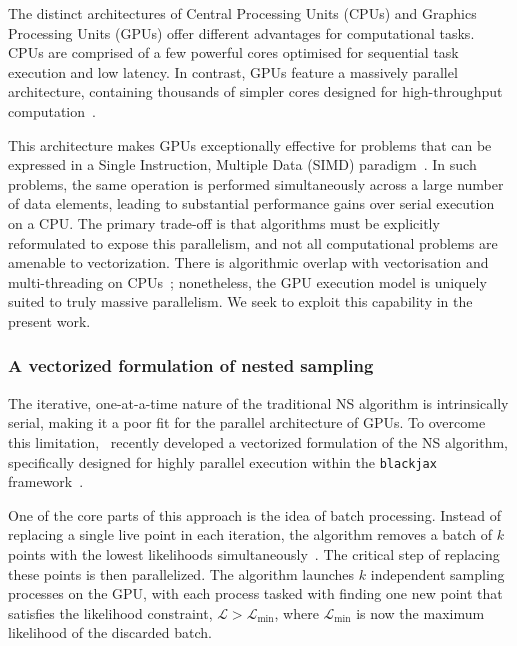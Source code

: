 \documentclass[fleqn,usenatbib]{mnras}
\begin{document}
The distinct architectures of Central Processing Units (CPUs) and
Graphics Processing Units (GPUs) offer different advantages for
computational tasks. CPUs are comprised of a few powerful cores
optimised for sequential task execution and low latency. In contrast,
GPUs feature a massively parallel architecture, containing thousands of
simpler cores designed for high-throughput computation~\citep{GPU_computing}.

This architecture makes GPUs exceptionally effective for problems that can
be expressed in a Single Instruction, Multiple Data (SIMD) paradigm~\citep{CUDAGuide}.
In such problems, the same operation is performed simultaneously across
a large number of data elements, leading to substantial performance
gains over serial execution on a CPU. The primary trade-off is that
algorithms must be explicitly reformulated to expose this parallelism,
and not all computational problems are amenable to vectorization.
There is algorithmic overlap with vectorisation and multi-threading on CPUs~\citep{Handley:2015vkr, Smith:2019ucc}; 
nonetheless, the GPU execution model is uniquely suited to truly massive parallelism. We seek to exploit this capability in the present work.


\subsubsection{A vectorized formulation of nested sampling}
\label{sec:background_vectorized_ns}

The iterative, one-at-a-time nature of the traditional NS algorithm
is intrinsically serial, making it a poor fit for the parallel
architecture of GPUs. To overcome this limitation,~\cite{yallup2025nested}
recently developed a vectorized formulation of the NS algorithm,
specifically designed for highly parallel execution within the
\texttt{blackjax} framework~\citep{cabezas2024blackjax}.

One of the core parts of this approach is the idea of batch
processing. Instead of replacing a single live point in each iteration,
the algorithm removes a batch of $k$ points with the lowest likelihoods
simultaneously~\citep{parallel_ns}. The critical step of replacing these points is then
parallelized. The algorithm launches $k$ independent sampling processes
on the GPU, with each process tasked with finding one new point that
satisfies the likelihood constraint, $\mathcal{L} > \mathcal{L}_{\text{min}}$,
where $\mathcal{L}_{\text{min}}$ is now the maximum likelihood of the
discarded batch.
\end{document}
